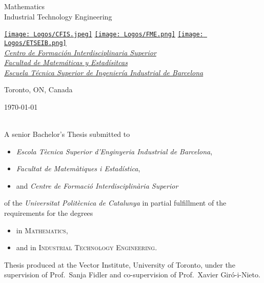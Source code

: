\begin{titlepage}
  \vfill

  \Large
  Mathematics \\
  Industrial Technology Engineering

  \vfill

  \large
  \href{https://href.com}{\texttt{[image: Logos/CFIS.jpeg]}}
  \hspace{2em}
  \href{https://href.com}{\texttt{[image: Logos/FME.png]}}
  \hspace{2em}
  \href{https://href.com}{\texttt{[image: Logos/ETSEIB.png]}} \\[1ex]
  {\slshape
  \href{https://href.com}{Centro de Formación Interdisciplinaria Superior} \\
  \href{https://href.com}{Facultad de Matemáticas y Estadísitcas} \\
  \href{https://href.com}{Escuela Técnica Superior de Ingeniería Industrial de Barcelona}}

  \vfill

  Toronto, ON, Canada \hfill \@date

  \makeatother
\end{titlepage}


\thispagestyle{plain}
\small
\null\vfill
\begin{sloppypar}
  \makeatletter
  \noindent \@author{} \textcopyright{} \today \\
  \texttt{\@title} \\
  \makeatother
\end{sloppypar}

\noindent A senior Bachelor's Thesis submitted to
\begin{itemize}
  \item \textsl{Escola Tècnica Superior d'Enginyeria Industrial de Barcelona},
  \item \textsl{Facultat de Matemàtiques i Estadística},
  \item and \textsl{Centre de Formació Interdisciplinària Superior}
\end{itemize}
of the \textit{Universitat Politècnica de Catalunya} in partial fulfillment of
the requirements for the degrees
\begin{itemize}
  \item in \textsc{Mathematics},
  \item and in \textsc{Industrial Technology Engineering}. \\
\end{itemize}

\noindent Thesis produced at the Vector Institute, University of Toronto, under
the supervision of Prof.\ Sanja Fidler and co-supervision of Prof.\ Xavier
Giró-i-Nieto. \\

